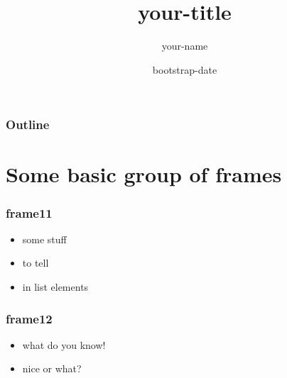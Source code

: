 \documentclass[bigger]{beamer}
\title{your-title}
\author{your-name}
\date{bootstrap-date}
\begin{document}
\maketitle

\begin{frame}
\frametitle{Outline}
\setcounter{tocdepth}{3}
\tableofcontents
\end{frame}



\section{Some basic group of frames}
\label{sec-1}
\begin{frame}
\frametitle{frame11}
\label{sec-1-1}
\begin{itemize}

\item some stuff
\label{sec-1-1-1}%

\item to tell
\label{sec-1-1-2}%

\item in list elements
\label{sec-1-1-3}%
\end{itemize} %
\end{frame}
\begin{frame}
\frametitle{frame12}
\label{sec-1-2}
\begin{itemize}

\item what do you know!
\label{sec-1-2-1}%

\item nice or what?
\label{sec-1-2-2}%
\end{itemize} %
\end{frame}
\end{document}
